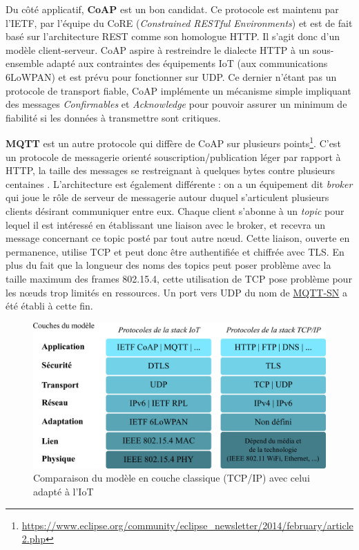 \documentclass[]{article}
\begin{document}
\par Du côté applicatif, \textbf{CoAP} est un bon candidat. Ce protocole est maintenu par l'IETF, par l'équipe du CoRE (\textit{Constrained RESTful Environments}) et est de fait basé sur l'architecture REST \cite{Granjal2015} comme son homologue HTTP. Il s'agit donc d'un modèle client-serveur. CoAP aspire à restreindre le dialecte HTTP à un sous-ensemble adapté aux contraintes des équipements IoT (aux communications 6LoWPAN) et est prévu pour fonctionner sur UDP. Ce dernier n'étant pas un protocole de transport fiable, CoAP implémente un mécanisme simple impliquant des messages \textit{Confirmables} et \textit{Acknowledge} pour pouvoir assurer un minimum de fiabilité si les données à transmettre sont critiques.\\

\par \textbf{MQTT} est un autre protocole qui diffère de CoAP sur plusieurs points\footnote{\url{https://www.eclipse.org/community/eclipse_newsletter/2014/february/article2.php}}. C'est un protocole de messagerie orienté souscription/publication léger par rapport à HTTP, la taille des messages se restreignant à quelques bytes contre plusieurs centaines \cite{Leos2014}. L'architecture est également différente : on a un équipement dit \textit{broker} qui joue le rôle de serveur de messagerie autour duquel s'articulent plusieurs clients désirant communiquer entre eux. Chaque client s'abonne à un \textit{topic} pour lequel il est intéressé en établissant une liaison avec le broker, et recevra un message concernant ce topic posté par tout autre nœud. Cette liaison, ouverte en permanence, utilise TCP et peut donc être authentifiée et chiffrée avec TLS. En plus du fait que la longueur des noms des topics peut poser problème avec la taille maximum des frames 802.15.4, cette utilisation de TCP pose problème pour les nœuds trop limités en ressources. Un port vers UDP du nom de \href{http://www.mqtt.org/new/wp-content/uploads/2009/06/MQTT-SN_spec_v1.2.pdf}{MQTT-SN} a été établi à cette fin.\\

\begin{figure}[!h]
\centering
\includegraphics[scale=0.85]{IoT_stack.png}
\caption{Comparaison du modèle en couche classique (TCP/IP) avec celui adapté à l'IoT}
\label{IoT_stack}
\end{figure}
\end{document}
